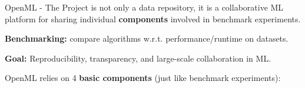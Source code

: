 \documentclass[11pt,compress,t,notes=noshow, xcolor=table]{beamer}
\begin{document}
\begin{frame}{OpenML - The Project }
 is not only a data repository, it is a collaborative ML platform for sharing individual \textbf{components} involved in benchmark experiments.

\textbf{Benchmarking:} compare algorithms w.r.t. performance/runtime on datasets.

\textbf{Goal:} Reproducibility, transparency, and large-scale collaboration in ML.

OpenML relies on 4 \textbf{basic components} (just like benchmark experiments):
\end{frame}
\end{document}

